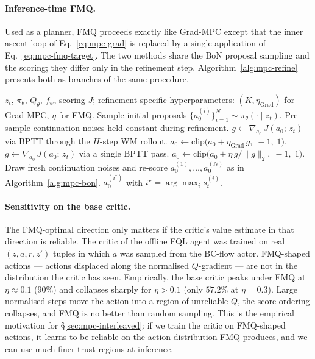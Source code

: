 \paragraph{Inference-time FMQ.}
Used as a planner, FMQ proceeds exactly like Grad-MPC except that the
inner ascent loop of Eq.~\eqref{eq:mpc-grad} is replaced by a single
application of Eq.~\eqref{eq:mpc-fmq-target}. The two methods share the
BoN proposal sampling and the scoring; they differ only in the
refinement step. Algorithm~\ref{alg:mpc-refine} presents both as
branches of the same procedure.

\begin{algorithm}[t]
\caption{Gradient-refined MPC. Grad-MPC ($K$ raw steps) and FMQ (one normalised step) share the proposal-and-score machinery and differ only in the inner refinement.}
\label{alg:mpc-refine}
\begin{algorithmic}[1]
\Require $z_t$, $\pi_\theta$, $Q_\theta$, $f_\psi$, scoring $J$; refinement-specific hyperparameters: $(K, \eta_{\text{Grad}})$ for Grad-MPC, $\eta$ for FMQ.
\State Sample initial proposals $\{a_0^{(i)}\}_{i=1}^N \sim \pi_\theta(\cdot \mid z_t)$.
\State Pre-sample continuation noises held constant during refinement.
        \State $g \leftarrow \nabla_{a_0}\, J(a_0;\,z_t)$ via BPTT through the $H$-step WM rollout.
        \State $a_0 \leftarrow \mathrm{clip}\big(a_0 + \eta_{\text{Grad}}\, g,\;-1,\;1\big)$.
    \EndFor
{}
    \State $g \leftarrow \nabla_{a_0}\, J(a_0;\,z_t)$ via a single BPTT pass.
    \State $a_0 \leftarrow \mathrm{clip}\big(a_0 + \eta\, g / \|g\|_2,\;-1,\;1\big)$.
\EndIf
\State Draw fresh continuation noises and re-score $a_0^{(1)}, \dots, a_0^{(N)}$ as in Algorithm~\ref{alg:mpc-bon}.
\State \Return $a_0^{(i^\star)}$ with $i^\star = \arg\max_i s_t^{(i)}$.
\end{algorithmic}
\end{algorithm}

\paragraph{Sensitivity on the base critic.}
The FMQ-optimal direction only matters if the critic's value estimate
in that direction is reliable. The critic of the offline FQL agent was
trained on real $(z, a, r, z')$ tuples in which $a$ was sampled from
the BC-flow actor. FMQ-shaped actions --- actions displaced along the
normalised $Q$-gradient --- are not in the distribution the critic has
seen. Empirically, the base critic peaks under FMQ at $\eta \approx 0.1$
($90\%$) and collapses sharply for $\eta > 0.1$ (only $57.2\%$ at
$\eta=0.3$). Large normalised steps move the action into a region of
unreliable $Q$, the score ordering collapses, and FMQ is no better than
random sampling. This is the empirical motivation for
§\ref{sec:mpc-interleaved}: if we train the critic on FMQ-shaped
actions, it learns to be reliable on the action distribution FMQ
produces, and we can use much finer trust regions at inference.

